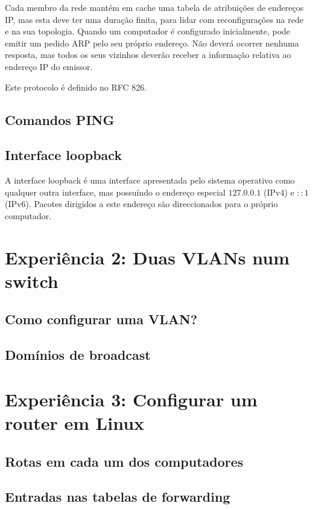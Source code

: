 \documentclass[a4paper,11pt,titlepage]{article}
\begin{document}
Cada membro da rede mantém em cache uma tabela de atribuições de endereços IP,
mas esta deve ter uma duração finita, para lidar com reconfigurações na rede e
na sua topologia. Quando um computador é configurado inicialmente, pode emitir
um pedido ARP pelo seu próprio endereço. Não deverá ocorrer nenhuma resposta,
mas todos os seus vizinhos deverão receber a informação relativa ao endereço IP
do emissor.

Este protocolo é definido no RFC 826.

\subsection{Comandos PING}

\subsection{Interface loopback}

A interface loopback é uma interface apresentada pelo sistema operativo como
qualquer outra interface, mas possuíndo o endereço especial $127.0.0.1$
(IPv4) e $::1$ (IPv6). Pacotes dirigidos a este endereço são direccionados para o
próprio computador.

\section{Experiência 2: Duas VLANs num switch }

\subsection{Como configurar uma VLAN?}

\subsection{Domínios de broadcast}

\section{Experiência 3: Configurar um router em Linux }

\subsection{Rotas em cada um dos computadores}

\subsection{Entradas nas tabelas de forwarding}
\end{document}
